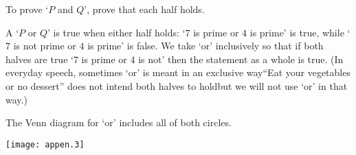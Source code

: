 To prove `\( P \) and \( Q \)', prove that each half holds.

A `\( P \) or \( Q \)' is true when either half holds:
`\( 7 \) is prime or \( 4 \) is prime' is true, while `\( 7 \) is not prime
or \( 4 \) is prime' is false.
We take `or' inclusively so that if both halves are true
`\( 7 \) is prime or \( 4 \) is not' then the statement as a whole is true.
(In everyday speech, sometimes `or' is meant in an exclusive way\Dash ``Eat
your vegetables or no dessert'' does not intend both halves to hold\Dash but
we will not use `or' in that way.)

The Venn diagram for `or' includes all of both circles.
\begin{center}
  \texttt{[image: appen.3]}
%
%
%
%
%
%
%
%
\end{center}

